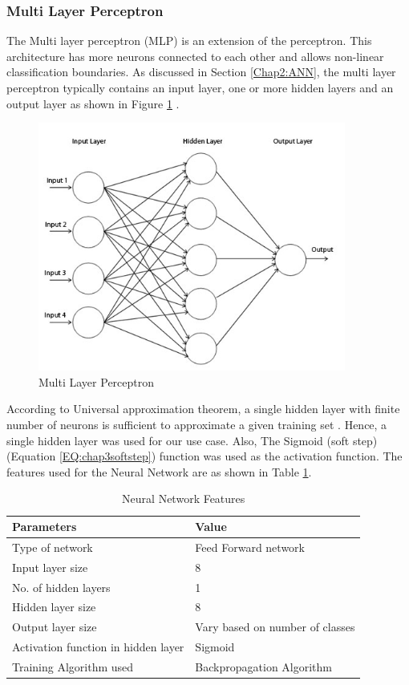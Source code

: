         \subsubsection{Multi Layer Perceptron}
        
        The Multi layer perceptron (MLP) is an extension of the perceptron. This architecture has more neurons connected to each other and allows  non-linear classification boundaries. As discussed in Section \ref{Chap2:ANN}, the multi layer perceptron typically contains an input layer, one or more hidden layers and an output layer as shown in Figure \ref{fig:chap3mult} . 

    \begin{figure}[hbtp]
    	\centering
    	\includegraphics[width=0.9\textwidth]{Chapter-3/mult}
    	\caption{Multi Layer Perceptron \cite{multipercep}}
    	\label{fig:chap3mult}
    \end{figure}
    
        According to Universal approximation theorem, a single hidden layer with finite number of neurons is sufficient to approximate a given training set \cite{simonHaykin}. Hence, a single hidden layer was used for our use case. Also, The Sigmoid (soft step) (Equation \ref{EQ:chap3softstep}) function was used as the activation function. The features used for the Neural Network are as shown in Table \ref{NN_features}.
        
		\begin{table}[h!]
			\centering
			\caption{Neural Network Features}
			\label{NN_features}
			\begin{tabular}{l l}
				\hline
				Parameters &Value\\\hline
				Type of network &Feed Forward network\\
				Input layer size &8\\
				No. of hidden layers &1\\
				Hidden layer size &8\\
                Output layer size &Vary based on number of classes\\
				Activation function in hidden layer &Sigmoid\\
                Training Algorithm used &Backpropagation Algorithm
			\end{tabular}
		\end{table}
        
